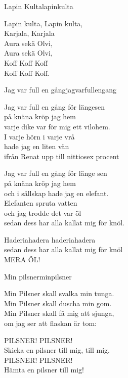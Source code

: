 \begin{song}{Lapin Kulta}{lapinkulta}
\begin{vers}
Lapin kulta, Lapin kulta,\\
Karjala, Karjala\\
Aura sekä Olvi,\\
Aura sekä Olvi,\\
Koff Koff Koff\\
Koff Koff Koff.\\
\end{vers}
\end{song}

\newpage

\begin{song}{Jag var full en gång}{jagvarfullengang}
\begin{vers}
Jag var full en gång för längesen\\
på knäna kröp jag hem\\
varje dike var för mig ett vilohem.\\
I varje hörn i varje vrå\\
hade jag en liten vän\\
ifrån Renat upp till nittiosex procent\\
\end{vers}
\begin{vers}
Jag var full en gång för länge sen\\
på knäna kröp jag hem\\
och i sällskap hade jag en elefant.\\
Elefanten spruta vatten\\
och jag trodde det var öl\\
sedan dess har alla kallat mig för knöl.\\
\end{vers}
\begin{vers}
Haderiahadera haderiahadera\\
sedan dess har alla kallat mig för knöl\\
MERA ÖL!\\
\end{vers}
\end{song}

\newpage

\begin{song}{Min pilsner}{minpilsner}
\begin{vers}
Min Pilsner skall svalka min tunga.\\
Min Pilsner skall duscha min gom.\\
Min Pilsner skall få mig att sjunga,\\
om jag ser att flaskan är tom:\\
\end{vers}
\begin{vers}
PILSNER! PILSNER!\\
Skicka en pilsner till mig, till mig.\\
PILSNER! PILSNER!\\
Hämta en pilsner till mig!\\
\end{vers}
\end{song}

